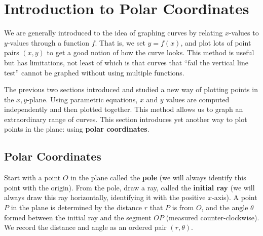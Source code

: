 \section{Introduction to Polar Coordinates}\label{sec:polar}

We are generally introduced to the idea of graphing curves by relating $x$-values to $y$-values through a function $f$. That is, we set $y=f(x)$, and plot lots of point pairs $(x,y)$ to get a good notion of how the curve looks. This method is useful but has limitations, not least of which is that curves that ``fail the vertical line test'' cannot be graphed without using multiple functions.

The previous two sections introduced and studied a new way of plotting points in the $x,y$-plane. Using parametric equations, $x$ and $y$ values are computed independently and then plotted together. This method allows us to graph an extraordinary range of curves. This section introduces yet another way to plot points in the plane: using \textbf{polar coordinates}.

\subsection{Polar Coordinates}


Start with a point $O$ in the plane called the \textbf{pole} (we will always identify this point with the origin). From the pole, draw a ray, called the \textbf{initial ray} (we will always draw this ray horizontally, identifying it with the positive $x$-axis). A point $P$ in the plane is determined by the distance $r$ that $P$ is from $O$, and the angle $\theta$ formed between the initial ray and the segment $\overline{OP}$ (measured counter-clockwise). We record the distance and angle as an ordered pair $(r,\theta)$.%

